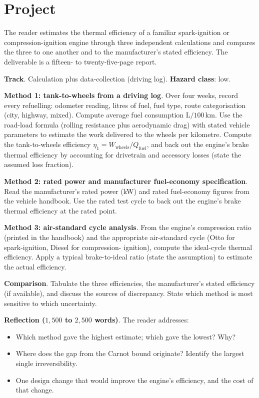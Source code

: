 \section{Project}

\begin{project}
The reader estimates the thermal efficiency of a familiar
spark-ignition or compression-ignition engine through three
independent calculations and compares the three to one another and to
the manufacturer's stated efficiency. The deliverable is a fifteen-
to twenty-five-page report.

\textbf{Track}. Calculation plus data-collection (driving log).
\textbf{Hazard class}: low.

\textbf{Method 1: tank-to-wheels from a driving log}. Over four weeks,
record every refuelling: odometer reading, litres of fuel, fuel
type, route categorisation (city, highway, mixed). Compute average
fuel consumption $\text{L}/100\,\text{km}$. Use the road-load
formula (rolling resistance plus aerodynamic drag) with stated
vehicle parameters to estimate the work delivered to the wheels per
kilometre. Compute the tank-to-wheels efficiency $\eta_1 =
W_{\text{wheels}}/Q_{\text{fuel}}$, and back out the engine's brake
thermal efficiency by accounting for drivetrain and accessory
losses (state the assumed loss fraction).

\textbf{Method 2: rated power and manufacturer fuel-economy
specification}. Read the manufacturer's rated power (kW) and rated
fuel-economy figures from the vehicle handbook. Use the rated test
cycle to back out the engine's brake thermal efficiency at the rated
point.

\textbf{Method 3: air-standard cycle analysis}. From the engine's
compression ratio (printed in the handbook) and the appropriate
air-standard cycle (Otto for spark-ignition, Diesel for compression-
ignition), compute the ideal-cycle thermal efficiency. Apply a
typical brake-to-ideal ratio (state the assumption) to estimate the
actual efficiency.

\textbf{Comparison}. Tabulate the three efficiencies, the
manufacturer's stated efficiency (if available), and discuss the
sources of discrepancy. State which method is most sensitive to
which uncertainty.

\textbf{Reflection ($1{,}500$ to $2{,}500$ words)}. The reader
addresses:

\begin{itemize}[leftmargin=*]
  \item Which method gave the highest estimate; which gave the
    lowest? Why?
  \item Where does the gap from the Carnot bound originate? Identify
    the largest single irreversibility.
  \item One design change that would improve the engine's
    efficiency, and the cost of that change.
\end{itemize}


\end{project}
